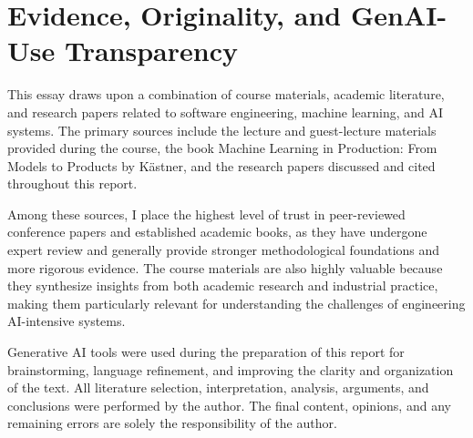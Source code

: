 \documentclass{article}
\begin{document}
\section{Evidence, Originality, and GenAI-Use Transparency}

This essay draws upon a combination of course materials, academic literature, and research papers related to software engineering, machine learning, and AI systems. The primary sources include the lecture and guest-lecture materials provided during the course, the book Machine Learning in Production: From Models to Products by Kästner, and the research papers discussed and cited throughout this report.

Among these sources, I place the highest level of trust in peer-reviewed conference papers and established academic books, as they have undergone expert review and generally provide stronger methodological foundations and more rigorous evidence. The course materials are also highly valuable because they synthesize insights from both academic research and industrial practice, making them particularly relevant for understanding the challenges of engineering AI-intensive systems.

Generative AI tools were used during the preparation of this report for brainstorming, language refinement, and improving the clarity and organization of the text. All literature selection, interpretation, analysis, arguments, and conclusions were performed by the author. The final content, opinions, and any remaining errors are solely the responsibility of the author.






\end{document}
